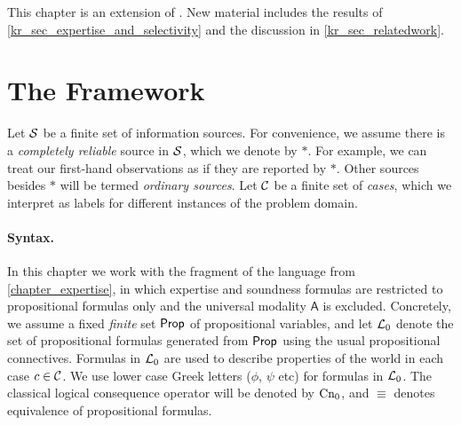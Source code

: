 This chapter is an extension of \textcite{singleton_booth_22}. New material
includes the results of \cref{kr_sec_expertise_and_selectivity} and the
discussion in \cref{kr_sec_relatedwork}.

\section{The Framework}
\label{kr_sec_framework}

Let $\mathcal{S}$ be a finite set of information sources. For convenience, we assume
there is a \emph{completely reliable} source in $\mathcal{S}$, which we denote by
$\ast$. For example, we can treat our first-hand observations as if they are
reported by $\ast$. Other sources besides $\ast$ will be termed \emph{ordinary
sources}. Let $\mathcal{C}$ be a finite set of \emph{cases}, which we interpret as
labels for different instances of the problem domain.

\paragraph{Syntax.}

In this chapter we work with the fragment of the language from
\cref{chapter_expertise}, in which expertise and soundness formulas are
restricted to propositional formulas only\footnotemark{} and the universal
modality $\mathsf{A}$ is excluded. Concretely, we assume
a fixed \emph{finite} set $\mathsf{Prop}$ of propositional variables, and let
$\mathcal{L}{}_0$ denote the set of propositional formulas generated from $\mathsf{Prop}$
using the usual propositional connectives. Formulas in $\mathcal{L}{}_0$ are used to
describe properties of the world in each case $c \in \mathcal{C}$. We use lower case
Greek letters ($\phi$, $\psi$ etc) for formulas in $\mathcal{L}{}_0$. The classical
logical consequence operator will be denoted by $\operatorname{Cn}_0$, and $\equiv$ denotes
equivalence of propositional formulas.



